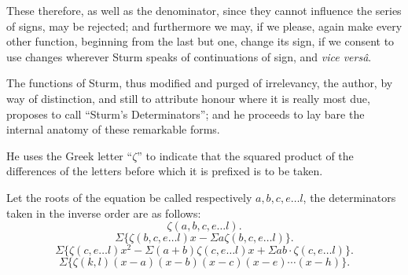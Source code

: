 \documentclass[11pt]{article}
\begin{document}
These therefore, as well as the denominator, since they cannot influence the series of signs, may be rejected; and furthermore we may, if we please, again make every other function, beginning from the last but one, change its sign, if we consent to use changes wherever Sturm speaks of continuations of sign, and \emph{vice vers\^a}.

The functions of Sturm, thus modified and purged of irrelevancy, the author, by way of distinction, and still to attribute honour where it is really most due, proposes to call ``Sturm's Determinators''; and he proceeds to lay bare the internal anatomy of these remarkable forms.

He uses the Greek letter ``$\zeta$'' to indicate that the squared product of the differences of the letters before which it is prefixed is to be taken.

Let the roots of the equation be called respectively $a,b,c,e\ldots l$, the determinators taken in the inverse order are as follows:
\[
\zeta(a,b,c,e\ldots l).
\]
\[
\Sigma\{\zeta(b,c,e\ldots l)x-\Sigma a\zeta(b,c,e\ldots l)\}.
\]
\[
\Sigma\{\zeta(c,e\ldots l)x^2-\Sigma(a+b)\zeta(c,e\ldots l)x+
        \Sigma ab\cdot \zeta(c,e\ldots l)\}.
\]
\[
\Sigma\{\zeta(k,l)(x-a)(x-b)(x-c)(x-e)\cdots(x-h)\}.
\]
\end{document}
